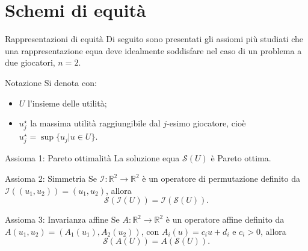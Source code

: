 \documentclass{beamer}
\begin{document}
\section{Schemi di equità}

\begin{frame}{Rappresentazioni di equità}
	Di seguito sono presentati gli assiomi più studiati che una rappresentazione equa deve idealmente soddisfare nel caso di un problema a due giocatori, $n=2$.
	 \begin{block}{Notazione}
	 	Si denota con:
	 	\begin{itemize}
	 		\item $U$ l'insieme delle utilità;
	 		\item $u_j^\star$ la massima utilità raggiungibile dal $j$-esimo giocatore, cioè $u_j^\star = \sup\{ u_j | u \in U \}$.
	 	\end{itemize}
	 \end{block}
\end{frame}

\begin{frame}
	\begin{exampleblock}{Assioma 1: Pareto ottimalità} \label{ax1}
		La soluzione equa $\mathcal{S}(U)$ è Pareto ottima.
	\end{exampleblock}
	\begin{exampleblock}{Assioma 2: Simmetria} \label{ax2}
		Se $\mathcal{I}:\mathbb{R}^2 \rightarrow \mathbb{R}^2$ è un operatore di permutazione definito da $\mathcal{I}((u_1,u_2)) = (u_1,u_2)$, allora 
		\begin{equation}
			\mathcal{S}(\mathcal{I}(U)) = \mathcal{I}(\mathcal{S}(U)).
		\end{equation}
	\end{exampleblock}
	\begin{exampleblock}{Assioma 3: Invarianza affine} \label{ax3}
		Se $A: \mathbb{R}^2 \rightarrow \mathbb{R}^2$ è un operatore affine definito da $A(u_1,u_2) = (A_1(u_1),A_2(u_2))$, con $A_i(u) = c_iu + d_i$ e $c_i>0$, allora 
		\begin{equation}
			\mathcal{S}(A(U)) = A(\mathcal{S}(U)).
		\end{equation}
	\end{exampleblock}
\end{frame}
\end{document}
